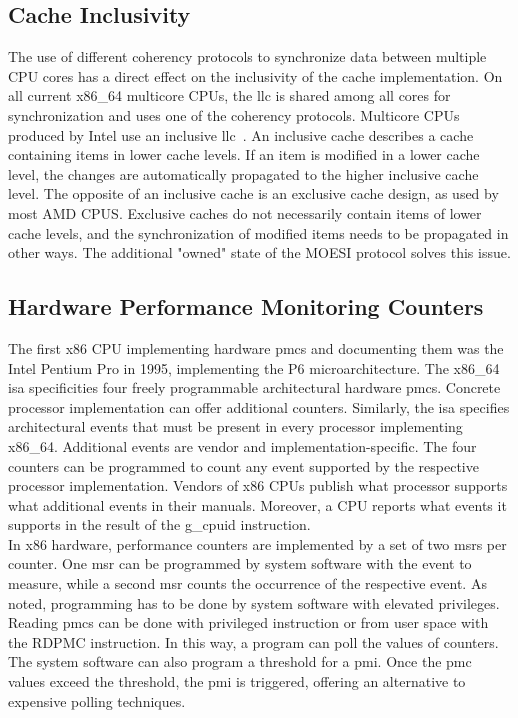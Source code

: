 \subsection{Cache Inclusivity}
\label{sec:state:technical:caches_inclusivity}
The use of different coherency protocols to synchronize data between multiple
CPU cores has a direct effect on the inclusivity of the cache implementation. On
all current x86\_64 multicore CPUs, the \gls{llc} is shared among all cores for
synchronization and uses one of the coherency protocols. Multicore CPUs produced
by Intel use an inclusive \gls{llc}~\cite{intel_optimization}. An inclusive
cache describes a cache containing items in lower cache levels. If an item is
modified in a lower cache level, the changes are automatically propagated to the
higher inclusive cache level. The opposite of an inclusive cache is an exclusive
cache design, as used by most AMD CPUS. Exclusive caches do not necessarily
contain items of lower cache levels, and the synchronization of modified items
needs to be propagated in other ways. The additional "owned" state of the MOESI
protocol solves this issue.

\subsection{Hardware Performance Monitoring Counters}
\label{sec:state:technical:hpc}
The first x86 CPU implementing hardware \glspl{pmc} and documenting them was the
Intel Pentium Pro in 1995, implementing the P6
microarchitecture.\cite{intel_sdm} The x86\_64 \gls{isa} specificities four
freely programmable architectural hardware \glspl{pmc}.\cite{amd_manual}
Concrete processor implementation can offer additional counters. Similarly, the
\gls{isa} specifies architectural events that must be present in every processor
implementing x86\_64. Additional events are vendor and implementation-specific.
The four counters can be programmed to count any event supported by the
respective processor implementation. Vendors of x86 CPUs publish what processor
supports what additional events in their manuals. Moreover, a CPU reports what
events it supports in the result of the \gls{g_cpuid} instruction. \\

In x86 hardware, performance counters are implemented by a set of two
\glspl{msr} per counter. One \gls{msr} can be programmed by system software with
the event to measure, while a second \gls{msr} counts the occurrence of the
respective event. As noted, programming has to be done by system software with
elevated privileges. Reading \glspl{pmc} can be done with privileged instruction
or from user space with the RDPMC instruction. In this way, a program can poll
the values of counters. The system software can also program a threshold for a
\gls{pmi}. Once the \gls{pmc} values exceed the threshold, the \gls{pmi} is
triggered, offering an alternative to expensive polling techniques.\\

